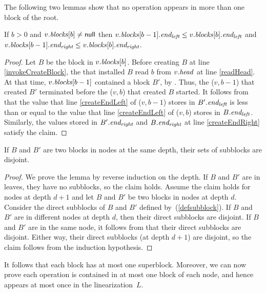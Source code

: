 The following two lemmas show that no operation appears in more than one block of the root.
\begin{lemma} \label{lem::headProgress}
 If $b>0$ and $v.\mbox{\textit{blocks}}[b] \neq \mbox{\sf null}$ then 
 $v.\mbox{\textit{blocks}}[b-1].\mbox{\textit{end\textsubscript{left}}} \leq v.\mbox{\textit{blocks}}[b].\mbox{\textit{end\textsubscript{left}}}$ and 
 $v.\mbox{\textit{blocks}}[b-1].\mbox{\textit{end\textsubscript{right}}} \leq v.\mbox{\textit{blocks}}[b].\mbox{\textit{end\textsubscript{right}}}$.
\end{lemma}
\begin{proof}
Let $B$ be the block in $v.\mbox{\textit{blocks}}[b]$.
Before creating $B$ at line \ref{invokeCreateBlock}, the  that installed $B$
read $b$ from $v.\mbox{\textit{head}}$ at line \ref{readHead}.
At that time, $v.\mbox{\textit{blocks}}[b-1]$ contained a block $B'$, by .
Thus, the ($v,b-1$) that created $B'$ terminated before the ($v,b$) that
created $B$ started.
It follows from  that the value that 
line \ref{createEndLeft} of ($v,b-1$) stores in $B'.\mbox{\textit{end\textsubscript{left}}}$   
is less than or equal to the value that line \ref{createEndLeft} of ($v,b$) 
stores in $B.\mbox{\textit{end\textsubscript{left}}}$.
Similarly, the values stored in $B'.\mbox{\textit{end\textsubscript{right}}}$ and $B.\mbox{\textit{end\textsubscript{right}}}$ at line \ref{createEndRight} 
satisfy the claim.
\end{proof}

\begin{lemma} \label{lem::subblocksDistinct}
If $B$ and $B'$ are two blocks in nodes at the same depth, their sets of subblocks are disjoint.
\end{lemma}
\begin{proof}
We prove the lemma by reverse induction on the depth.
If $B$ and $B'$ are in leaves, they have no subblocks, so the claim holds.
Assume the claim holds for nodes at depth $d+1$ and let $B$ and $B'$ be two blocks in nodes at depth $d$.
Consider the direct subblocks of $B$ and $B'$ defined by~(\ref{defsubblock}).
If $B$ and $B'$ are in different nodes at depth $d$, then their direct subblocks are disjoint.
If $B$ and $B'$ are in the same node, it follows from  that their direct subblocks are disjoint.
Either way, their direct subblocks (at depth $d+1$) are disjoint, so the claim follows from the induction hypothesis.
\end{proof}

It follows that each block has at most one superblock.
Moreover, we can now prove each operation is contained in at most one block of each node,
and hence appears at most once in the linearization~$L$.

